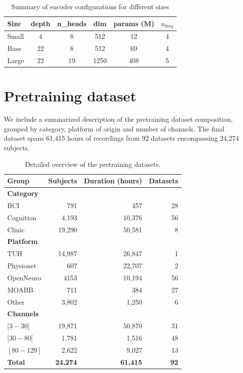 \documentclass{article}
\begin{document}
\begin{table}[ht]
\centering
\caption{Summary of encoder configurations for different sizes}
\begin{tabular}{lccccc}
\toprule
\textbf{Size} & \textbf{depth} & \textbf{n\_heads} & \textbf{dim}  &\textbf{params (M)} & $n_\text{freq}$\\
\midrule
 Small& 4& 8 & 512 &12 & 4\\
 Base& 22 & 8 & 512 & 69 & 4\\
 Large& 22 & 19 & 1250 & 408 & 5\\
\bottomrule
\end{tabular}
\label{tab:config_summary}
\end{table} 


\section{Pretraining dataset}

We include a summarized description of the pretraining dataset composition, grouped by category, platform of origin and number of channels. The final dataset spans 61,415 hours of recordings from 92 datasets encompassing 24,274 subjects.

\begin{table}[H]
\centering
\caption{Detailed overview of the pretraining datasets.}
\begin{tabular}{lrrr}
\toprule
\textbf{Group} & \textbf{Subjects} & \textbf{Duration (hours)} & \textbf{Datasets} \\
\midrule
\multicolumn{4}{l}{\textbf{Category}} \\
BCI        & 791   & 457 & 28 \\
Cognition  & 4,193  & 10,376 & 56 \\
Clinic     & 19,290 & 50,581 & 8 \\
\midrule
\multicolumn{4}{l}{\textbf{Platform}} \\
TUH        & 14,987   & 26,847   & 1 \\
Physionet  & 607     & 22,707   & 2 \\
OpenNeuro  & 4153    & 10,194   & 56 \\
MOABB      & 711     & 384     & 27 \\
Other      & 3,802    & 1,250    & 6 \\
\midrule
\multicolumn{4}{l}{\textbf{Channels}} \\
$[3-30[$       & 19,871   & 50,870   & 31 \\
$[30-80[$      & 1,781    & 1,516    & 48 \\
$[80-129]$     & 2,622    & 9,027    & 13 \\
\midrule
\textbf{Total} & \textbf{24,274} & \textbf{61,415} & \textbf{92} \\
\bottomrule
\end{tabular}
\label{tab:dataset_sumamry}
\end{table}
\end{document}
